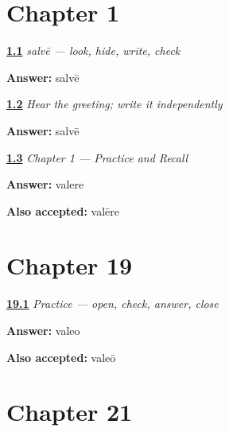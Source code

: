 \section*{Chapter 1}

\noindent\begin{minipage}[t]{\linewidth}
\raggedright
\hyperlink{review-LA-W01-salve-delayed-copy-check}{\textbf{1.1}} \emph{salvē — look, hide, write, check}\par
\small \textbf{Answer:} salvē\par
\end{minipage}\par\medskip

\noindent\begin{minipage}[t]{\linewidth}
\raggedright
\hyperlink{review-LA-W01-salve-dictation-check}{\textbf{1.2}} \emph{Hear the greeting; write it independently}\par
\small \textbf{Answer:} salvē\par
\end{minipage}\par\medskip

\noindent\begin{minipage}[t]{\linewidth}
\raggedright
\hyperlink{review-LA-C01-practice-vale-root}{\textbf{1.3}} \emph{Chapter 1 — Practice and Recall}\par
\small \textbf{Answer:} valere\par
\footnotesize \textbf{Also accepted:} valēre
\end{minipage}\par\medskip

\section*{Chapter 19}

\noindent\begin{minipage}[t]{\linewidth}
\raggedright
\hyperlink{review-LA-C19-practice-answer-line}{\textbf{19.1}} \emph{Practice — open, check, answer, close}\par
\small \textbf{Answer:} valeo\par
\footnotesize \textbf{Also accepted:} valeō
\end{minipage}\par\medskip

\section*{Chapter 21}

